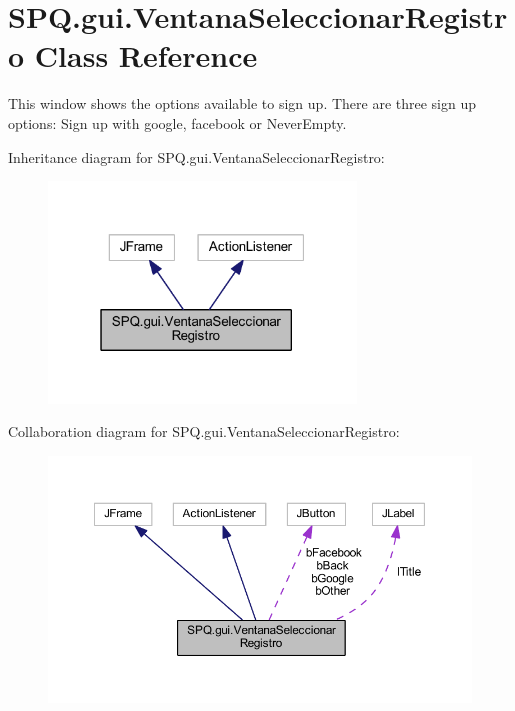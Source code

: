 \hypertarget{class_s_p_q_1_1gui_1_1_ventana_seleccionar_registro}{}\section{S\+P\+Q.\+gui.\+Ventana\+Seleccionar\+Registro Class Reference}
\label{class_s_p_q_1_1gui_1_1_ventana_seleccionar_registro}


This window shows the options available to sign up. There are three sign up options\+: Sign up with google, facebook or Never\+Empty.  




Inheritance diagram for S\+P\+Q.\+gui.\+Ventana\+Seleccionar\+Registro\+:\nopagebreak
\begin{figure}[H]
\begin{center}
\leavevmode
\includegraphics[width=232pt]{class_s_p_q_1_1gui_1_1_ventana_seleccionar_registro__inherit__graph}
\end{center}
\end{figure}


Collaboration diagram for S\+P\+Q.\+gui.\+Ventana\+Seleccionar\+Registro\+:\nopagebreak
\begin{figure}[H]
\begin{center}
\leavevmode
\includegraphics[width=350pt]{class_s_p_q_1_1gui_1_1_ventana_seleccionar_registro__coll__graph}
\end{center}
\end{figure}
